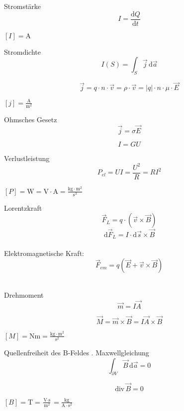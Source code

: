 \documentclass[a7paper]{kartei}
\begin{document}
\begin{karte}{Stromstärke}
\[
I = \frac{\mathrm{d}Q}{\mathrm{d}t}
\]

\([I] = \text{A}\)
\end{karte}

\begin{karte}{Stromdichte}
\[
I(S) = \int_S \vec{j} \, \mathrm{d}\vec{a}
\]

\[
\vec{j} = q \cdot n \cdot \vec{v} = \rho \cdot \vec{v} = |q| \cdot n \cdot \mu \cdot \vec{E}
\]

\([j] = \frac{\text{A}}{\text{m}^2}\)
\end{karte}

\begin{karte}{Ohmsches Gesetz}
\[
\vec{j} = \sigma \vec{E}
\]

\[
I = G U
\]
\end{karte}

\begin{karte}{Verlustleistung}
\[
P_{el} = U I = \frac{U^2}{R} = R I^2
\]

\([P] = \text{W} = \text{V} \cdot \text{A} = \frac{\text{kg} \cdot \text{m}^2}{\text{s}^3}\)
\end{karte}

\begin{karte}[Magnetostatik]{Lorentzkraft}
\[
\vec{F}_{L} = q \cdot (\vec{v} \times \vec{B})
\]
\[
\mathrm{d}\vec{F}_{L} = I \cdot \mathrm{d}\vec{s} \times \vec{B}
\]
\\
Elektromagnetische Kraft:
\[
\vec{F}_{em} = q (\vec{E} + \vec{v} \times \vec{B})
\]
\\
\end{karte}

\begin{karte}[Magnetostatik]{Drehmoment}
\[
\vec{m} = I\vec{A}
\]

\[
\vec{M} = \vec{m} \times \vec{B} = I \vec{A} \times \vec{B}
\]

\([M] = \text{Nm} = \frac{\text{kg} \cdot \text{m}^2}{\text{s}^2}\)
\end{karte}

\begin{karte}[Magnetostatik]{Quellenfreiheit des B-Feldes}
. Maxwellgleichung
\\
\[
\int_{\partial V} \vec{B} \, \mathrm{d}\vec{a} = 0\]

\[
\text{div} \, \vec{B} = 0
\]

\([B] = \text{T} = \frac{\text{V} \cdot \text{s}}{\text{m}^2} = \frac{\text{kg}}{\text{A} \cdot \text{s}^2}\)
\end{karte}
\end{document}
